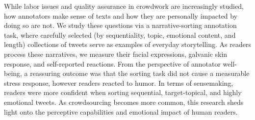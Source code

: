 While labor issues and quality assurance in crowdwork are increasingly studied, how annotators make sense of texts and how they are personally impacted by doing so are not. We study these questions via a narrative-sorting annotation task, where carefully selected (by sequentiality, topic, emotional content, and length) collections of tweets serve as examples of everyday storytelling. As readers process these narratives, we measure their facial expressions, galvanic skin response, and self-reported reactions. From the perspective of annotator well-being, a reassuring outcome was that the sorting task did not cause a measurable stress response, however readers reacted to humor. In terms of sensemaking, readers were more confident when sorting sequential, target-topical, and highly emotional tweets. As crowdsourcing becomes more common, this research sheds light onto the perceptive capabilities and emotional impact of human readers.
